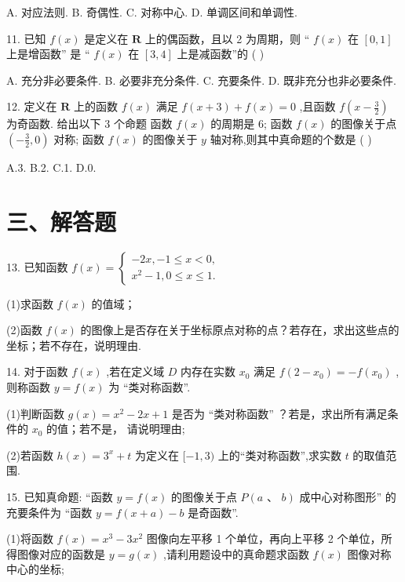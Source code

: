 A. 对应法则. B. 奇偶性. C. 对称中心. D. 单调区间和单调性.



11. 已知 $f\left( x\right)$ 是定义在 $\mathbf{R}$ 上的偶函数，且以 2 为周期，则 “ $f\left( x\right)$ 在 $\left\lbrack  {0,1}\right\rbrack$ 上是增函数” 是 “ $f\left( x\right)$ 在 $\left\lbrack  {3,4}\right\rbrack$ 上是减函数”的 ( )

A. 充分非必要条件. B. 必要非充分条件. C. 充要条件. D. 既非充分也非必要条件.

12. 定义在 $\mathbf{R}$ 上的函数 $f\left( x\right)$ 满足 $f\left( {x + 3}\right)  + f\left( x\right)  = 0$ ,且函数 $f\left( {x - \frac{3}{2}}\right)$ 为奇函数. 给出以下 3 个命题   函数 $f\left( x\right)$ 的周期是 6;   函数 $f\left( x\right)$ 的图像关于点 $\left( {-\frac{3}{2},0}\right)$ 对称;   函数 $f\left( x\right)$ 的图像关于 $y$ 轴对称,则其中真命题的个数是 ( )

A.3. B.2. C.1. D.0.

\section*{三、解答题}

13. 已知函数 $f\left( x\right)  = \left\{  \begin{array}{l}  - {2x}, - 1 \leq  x < 0, \\  {x}^{2} - 1,0 \leq  x \leq  1. \end{array}\right.$

(1)求函数 $f\left( x\right)$ 的值域；

(2)函数 $f\left( x\right)$ 的图像上是否存在关于坐标原点对称的点？若存在，求出这些点的坐标；若不存在，说明理由.

14. 对于函数 $f\left( x\right)$ ,若在定义域 $D$ 内存在实数 ${x}_{0}$ 满足 $f\left( {2 - {x}_{0}}\right)  =  - f\left( {x}_{0}\right)$ ,则称函数 $y = f\left( x\right)$ 为 “类对称函数”.

(1)判断函数 $g\left( x\right)  = {x}^{2} - {2x} + 1$ 是否为 “类对称函数” ？若是，求出所有满足条件的 ${x}_{0}$ 的值；若不是， 请说明理由;

(2)若函数 $h\left( x\right)  = {3}^{x} + t$ 为定义在 $\lbrack  - 1,3)$ 上的“类对称函数”,求实数 $t$ 的取值范围.

15. 已知真命题: “函数 $y = f\left( x\right)$ 的图像关于点 $P\left( {a\text{ 、 }b}\right)$ 成中心对称图形” 的充要条件为 “函数 $y = f(x +  a) - b$ 是奇函数”.

(1)将函数 $f\left( x\right)  = {x}^{3} - 3{x}^{2}$ 图像向左平移 1 个单位，再向上平移 2 个单位，所得图像对应的函数是 $y =  g\left( x\right)$ ,请利用题设中的真命题求函数 $f\left( x\right)$ 图像对称中心的坐标;

